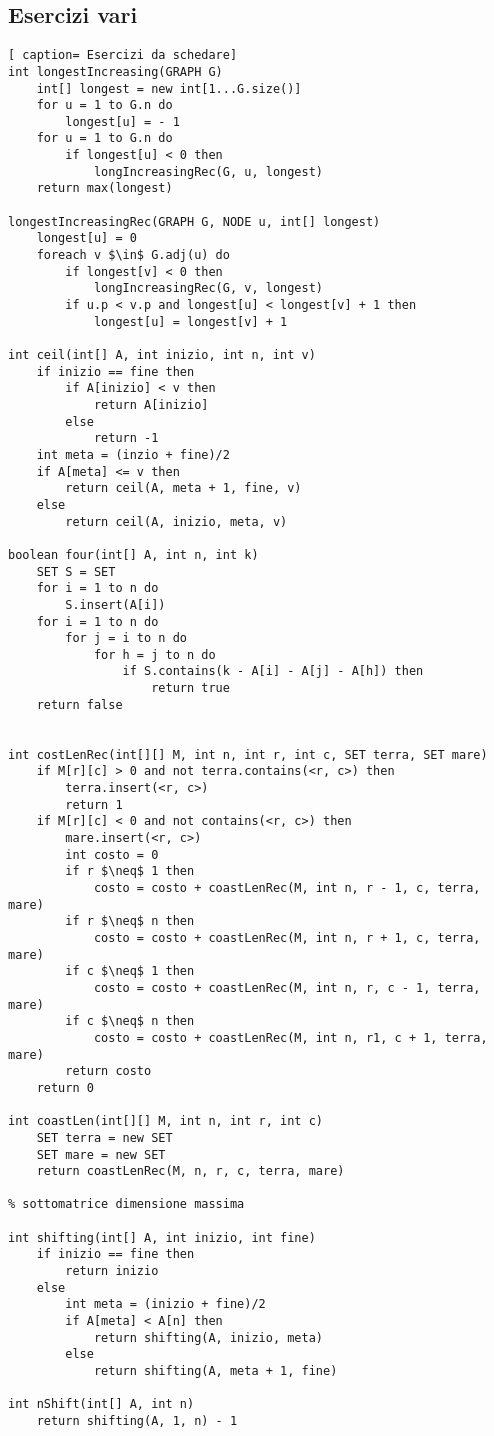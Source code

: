 \documentclass[../cheatSheetAlgoritmi.tex]{subfiles}
\begin{document}
\subsection{Esercizi vari}
\begin{lstlisting}[ caption= Esercizi da schedare]
int longestIncreasing(GRAPH G)
	int[] longest = new int[1...G.size()]
  	for u = 1 to G.n do
    	longest[u] = - 1
  	for u = 1 to G.n do
    	if longest[u] < 0 then
      		longIncreasingRec(G, u, longest)
  	return max(longest)

longestIncreasingRec(GRAPH G, NODE u, int[] longest)
	longest[u] = 0
  	foreach v $\in$ G.adj(u) do
    	if longest[v] < 0 then
      		longIncreasingRec(G, v, longest)
    	if u.p < v.p and longest[u] < longest[v] + 1 then
   			longest[u] = longest[v] + 1

int ceil(int[] A, int inizio, int n, int v)
	if inizio == fine then
    	if A[inizio] < v then
     		return A[inizio]
    	else
      		return -1
  	int meta = (inzio + fine)/2
  	if A[meta] <= v then
    	return ceil(A, meta + 1, fine, v)
  	else
    	return ceil(A, inizio, meta, v)

boolean four(int[] A, int n, int k) 
	SET S = SET
  	for i = 1 to n do 
    	S.insert(A[i])
  	for i = 1 to n do 
    	for j = i to n do 
      		for h = j to n do 
        		if S.contains(k - A[i] - A[j] - A[h]) then 
          			return true
  	return false
  

int costLenRec(int[][] M, int n, int r, int c, SET terra, SET mare)
	if M[r][c] > 0 and not terra.contains(<r, c>) then 
    	terra.insert(<r, c>)
    	return 1
  	if M[r][c] < 0 and not contains(<r, c>) then
    	mare.insert(<r, c>)
    	int costo = 0
    	if r $\neq$ 1 then
      		costo = costo + coastLenRec(M, int n, r - 1, c, terra, mare)
    	if r $\neq$ n then
      		costo = costo + coastLenRec(M, int n, r + 1, c, terra, mare)
    	if c $\neq$ 1 then
      		costo = costo + coastLenRec(M, int n, r, c - 1, terra, mare)
    	if c $\neq$ n then
      		costo = costo + coastLenRec(M, int n, r1, c + 1, terra, mare)
    	return costo
 	return 0

int coastLen(int[][] M, int n, int r, int c)
	SET terra = new SET
  	SET mare = new SET
  	return coastLenRec(M, n, r, c, terra, mare)
  
% sottomatrice dimensione massima

int shifting(int[] A, int inizio, int fine)
	if inizio == fine then
    	return inizio
  	else
    	int meta = (inizio + fine)/2
    	if A[meta] < A[n] then
      		return shifting(A, inizio, meta)
    	else
      		return shifting(A, meta + 1, fine)

int nShift(int[] A, int n)
	return shifting(A, 1, n) - 1
\end{lstlisting}
\newpage
\end{document}
